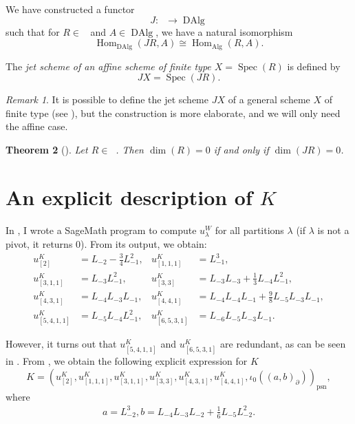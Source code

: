 \documentclass[a4paper, 12pt, reqno]{amsart}
\newtheorem{theorem}{Theorem}[section]
\theoremstyle{remark}
\newtheorem{remark}[theorem]{Remark}
\DeclareMathOperator{\psn}{psn}
\DeclareMathOperator{\Hom}{Hom}
\DeclareMathOperator{\Spec}{Spec}
\DeclareMathOperator{\Alg}{Alg}
\DeclareMathOperator{\Algf}{Alg^f}
\DeclareMathOperator{\DAlg}{DAlg}
\begin{document}
We have constructed a functor
\begin{equation*}
  J: \Algf \to \DAlg
\end{equation*}
such that for $R \in \Algf$ and $A \in \DAlg$, we have a natural isomorphism
\begin{equation*}
  \Hom_{\DAlg}(JR, A) \cong \Hom_{\Alg}(R, A).
\end{equation*}

The \emph{jet scheme of an affine scheme of finite type $X = \Spec(R)$} is defined by
\begin{equation*}
  JX = \Spec(JR).
\end{equation*}

\begin{remark}
  \label{rmk:53}
  It is possible to define the jet scheme $JX$ of a general scheme $X$ of finite type (see \cite{ein_jet_2008}), but the construction is more elaborate, and we will only need the affine case.
\end{remark}

\begin{theorem}[{\cite{ein_jet_2008}}]
  \label{thr:59}
  Let $R \in \Algf$.
  Then $\dim(R) = 0$ if and only if $\dim(JR) = 0$.
\end{theorem}

\section{An explicit description of $K$}
\label{sec:an-expl-descr}

In \cite[ising-modules.ipynb]{sagemath2}, I wrote a SageMath program to compute $u^W_{\lambda}$ for all partitions $\lambda$ (if $\lambda$ is not a pivot, it returns $0$).
From its output, we obtain:
\begin{align*}
  u^K_{[2]} &= L_{-2} - \tfrac{3}{4}L_{-1}^2, &u^K_{[1, 1, 1]} &= L_{-1}^3, \\
  u^K_{[3, 1, 1]} &= L_{-3}L_{-1}^2, &u^K_{[3, 3]} &= L_{-3}L_{-3} + \tfrac{1}{3}L_{-4}L_{-1}^2, \\
  u^K_{[4, 3, 1]} &= L_{-4}L_{-3}L_{-1}, &u^K_{[4, 4, 1]} &= L_{-4}L_{-4}L_{-1} + \tfrac{9}{8}L_{-5}L_{-3}L_{-1}, \\
  u^K_{[5, 4, 1, 1]} &= L_{-5}L_{-4}L_{-1}^2, &u^K_{[6, 5, 3, 1]} &= L_{-6}L_{-5}L_{-3}L_{-1}.
\end{align*}

However, it turns out that $u^K_{[5, 4, 1, 1]}$ and $u^K_{[6, 5, 3, 1]}$ are redundant, as can be seen in \cite[m11-m15.ipynb]{sagemath2}.
From \cite[Theorem 2]{andrews_singular_2022}, we obtain the following explicit expression for $K$
\begin{equation*}
  K = (u^K_{[2]}, u^K_{[1, 1, 1]}, u^K_{[3, 1, 1]}, u^K_{[3, 3]}, u^K_{[4, 3, 1]}, u^K_{[4, 4, 1]}, \iota_0((a, b)_{\partial}))_{\psn},
\end{equation*}
where
\begin{align*}
  a = L_{-2}^3, b = L_{-4}L_{-3}L_{-2} + \tfrac{1}{6}L_{-5}L_{-2}^2.
\end{align*}
\end{document}
